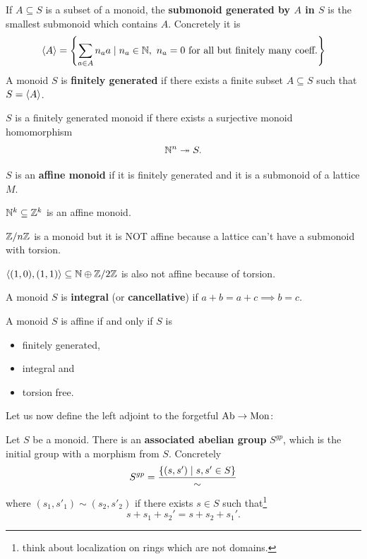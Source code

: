 \begin{definition}
If $A\subseteq S$ is a subset of a monoid, the \textbf{submonoid generated by $A$ in $S$} is the smallest submonoid which contains $A$. Concretely it is 
\[\left\langle {A}\right\rangle=\left\{{\sum_{a\in A} n_a a\mid n_a\in \mathbb{N},\ n_a=0\text{ for all but finitely many coeff.}}\right\}\]
A monoid $S$ is \textbf{finitely generated} if there exists a finite subset $A\subseteq S$ such that $S=\left\langle {A}\right\rangle$.
\end{definition}

\begin{remark}
$S$ is a finitely generated monoid if there exists a surjective monoid homomorphism
\[\mathbb{N}^n\twoheadrightarrow S.\]
\end{remark}

\begin{definition}
$S$ is an \textbf{affine monoid} if it is finitely generated and it is a submonoid of a lattice $M$.
\end{definition}

\begin{example}
$\mathbb{N}^k\subseteq \mathbb{Z}^k$ is an affine monoid.
\end{example}

\begin{example}
${\mathbb{Z}/{n}\mathbb{Z}}$ is a monoid but it is NOT affine because a lattice can't have a submonoid with torsion.
\end{example}

\begin{example}
$\left\langle {(1,0),(1,1)}\right\rangle\subseteq \mathbb{N}\oplus {\mathbb{Z}/{2}\mathbb{Z}}$ is also not affine because of torsion.
\end{example}

\begin{definition}[Integrality]
A monoid $S$ is \textbf{integral} (or \textbf{cancellative}) if $a+b=a+c\implies b=c$.
\end{definition}

\begin{fact}
A monoid $S$ is affine if and only if $S$ is
\begin{itemize}
\item finitely generated,
\item integral and
\item torsion free.
\end{itemize}
\end{fact}

Let us now define the left adjoint to the forgetful $\mathrm{Ab}\to \mathrm{Mon}$:

\begin{definition}
Let $S$ be a monoid. There is an \textbf{associated abelian group} $S^{gp}$, which is the initial group with a morphism from $S$. Concretely
\[S^{gp}=\frac{\left\{{(s,s')\mid s,s'\in S}\right\}}\sim\]
where $(s_1,s'_1)\sim(s_2,s'_2)$ if there exists $s\in S$ such that\footnote{think about localization on rings which are not domains.}
\[s+s_1+s_2'=s+s_2+s_1'.\]
\end{definition}

